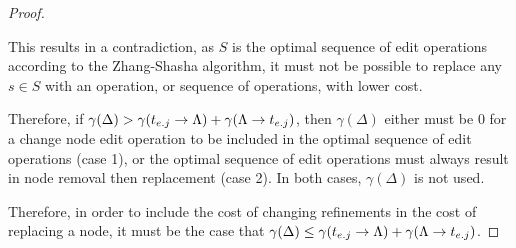 \begin{lemma}
\begin{proof}
\begin{enumerate}
                  This results in a contradiction, as $S$ is the optimal sequence of edit operations according to the Zhang-Shasha algorithm, it must not be possible to replace any $s \in S$ with an operation, or sequence of operations, with lower cost.
        \end{enumerate}

        Therefore, if $\gamma(\Delta) > \gamma(t_{{e}.{j}} \rightarrow {\Lambda}) + \gamma(\Lambda \rightarrow {t_{{e}.{j}}})$, then $\gamma(\Delta)$ either must be 0 for a change node edit operation to be included in the optimal sequence of edit operations (case 1), or the optimal sequence of edit operations must always result in node removal then replacement (case 2). In both cases, $\gamma(\Delta)$ is not used.

        Therefore, in order to include the cost of changing refinements in the cost of replacing a node, it must be the case that $\gamma(\Delta) \le \gamma(t_{{e}.{j}} \rightarrow {\Lambda}) + \gamma(\Lambda \rightarrow {t_{{e}.{j}}})$.


    \end{proof}


\end{lemma}






